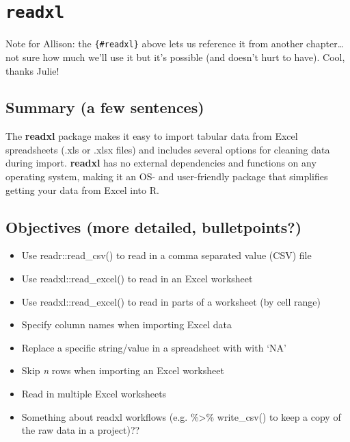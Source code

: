 \documentclass[]{book}
\providecommand{\tightlist}{%
  \setlength{\itemsep}{0pt}\setlength{\parskip}{0pt}}
\begin{document}
\hypertarget{readxl}{%
\chapter{\texorpdfstring{\texttt{readxl}}{readxl}}\label{readxl}}

Note for Allison: the \texttt{\{\#readxl\}} above lets us reference it from another chapter\ldots{}not sure how much we'll use it but it's possible (and doesn't hurt to have). Cool, thanks Julie!

\hypertarget{summary-a-few-sentences-1}{%
\section{Summary (a few sentences)}\label{summary-a-few-sentences-1}}

The \textbf{readxl} package makes it easy to import tabular data from Excel spreadsheets (.xls or .xlsx files) and includes several options for cleaning data during import. \textbf{readxl} has no external dependencies and functions on any operating system, making it an OS- and user-friendly package that simplifies getting your data from Excel into R.

\hypertarget{objectives-more-detailed-bulletpoints-1}{%
\section{Objectives (more detailed, bulletpoints?)}\label{objectives-more-detailed-bulletpoints-1}}

\begin{itemize}
\tightlist
\item
  Use readr::read\_csv() to read in a comma separated value (CSV) file
\item
  Use readxl::read\_excel() to read in an Excel worksheet
\item
  Use readxl::read\_excel() to read in parts of a worksheet (by cell range)
\item
  Specify column names when importing Excel data
\item
  Replace a specific string/value in a spreadsheet with with `NA'
\item
  Skip \emph{n} rows when importing an Excel worksheet
\item
  Read in multiple Excel worksheets
\item
  Something about readxl workflows (e.g. \%\textgreater{}\% write\_csv() to keep a copy of the raw data in a project)??
\end{itemize}
\end{document}
